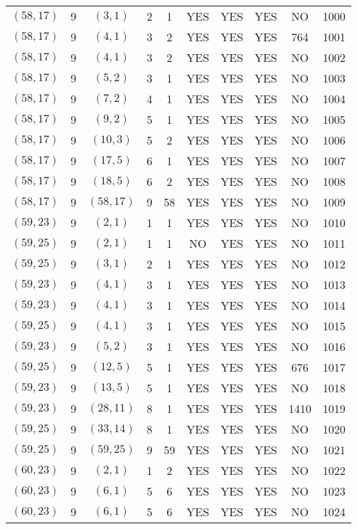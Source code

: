 \begin{longtable}{|c|c|c|c|c|c|c|c|c|c|}
$(58, 17)$ & 9 & $(3, 1)$ & 2 & 1 & YES & YES & YES & NO & 1000\\
$(58, 17)$ & 9 & $(4, 1)$ & 3 & 2 & YES & YES & YES & 764 & 1001\\
$(58, 17)$ & 9 & $(4, 1)$ & 3 & 2 & YES & YES & YES & NO & 1002\\
$(58, 17)$ & 9 & $(5, 2)$ & 3 & 1 & YES & YES & YES & NO & 1003\\
$(58, 17)$ & 9 & $(7, 2)$ & 4 & 1 & YES & YES & YES & NO & 1004\\
$(58, 17)$ & 9 & $(9, 2)$ & 5 & 1 & YES & YES & YES & NO & 1005\\
$(58, 17)$ & 9 & $(10, 3)$ & 5 & 2 & YES & YES & YES & NO & 1006\\
$(58, 17)$ & 9 & $(17, 5)$ & 6 & 1 & YES & YES & YES & NO & 1007\\
$(58, 17)$ & 9 & $(18, 5)$ & 6 & 2 & YES & YES & YES & NO & 1008\\
$(58, 17)$ & 9 & $(58, 17)$ & 9 & 58 & YES & YES & YES & NO & 1009\\
$(59, 23)$ & 9 & $(2, 1)$ & 1 & 1 & YES & YES & YES & NO & 1010\\
$(59, 25)$ & 9 & $(2, 1)$ & 1 & 1 & NO & YES & YES & NO & 1011\\
$(59, 25)$ & 9 & $(3, 1)$ & 2 & 1 & YES & YES & YES & NO & 1012\\
$(59, 23)$ & 9 & $(4, 1)$ & 3 & 1 & YES & YES & YES & NO & 1013\\
$(59, 23)$ & 9 & $(4, 1)$ & 3 & 1 & YES & YES & YES & NO & 1014\\
$(59, 25)$ & 9 & $(4, 1)$ & 3 & 1 & YES & YES & YES & NO & 1015\\
$(59, 23)$ & 9 & $(5, 2)$ & 3 & 1 & YES & YES & YES & NO & 1016\\
$(59, 25)$ & 9 & $(12, 5)$ & 5 & 1 & YES & YES & YES & 676 & 1017\\
$(59, 23)$ & 9 & $(13, 5)$ & 5 & 1 & YES & YES & YES & NO & 1018\\
$(59, 23)$ & 9 & $(28, 11)$ & 8 & 1 & YES & YES & YES & 1410 & 1019\\
$(59, 25)$ & 9 & $(33, 14)$ & 8 & 1 & YES & YES & YES & NO & 1020\\
$(59, 25)$ & 9 & $(59, 25)$ & 9 & 59 & YES & YES & YES & NO & 1021\\
$(60, 23)$ & 9 & $(2, 1)$ & 1 & 2 & YES & YES & YES & NO & 1022\\
$(60, 23)$ & 9 & $(6, 1)$ & 5 & 6 & YES & YES & YES & NO & 1023\\
$(60, 23)$ & 9 & $(6, 1)$ & 5 & 6 & YES & YES & YES & NO & 1024\\

\end{longtable}
